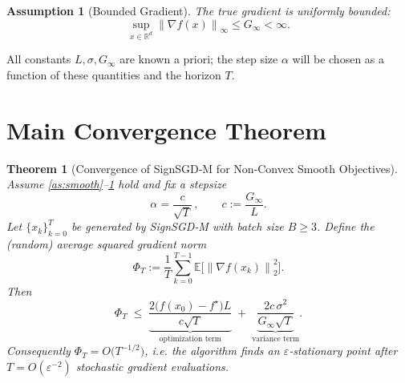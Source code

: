 \documentclass{article}
\newtheorem{theorem}{Theorem}
\newtheorem{assumption}{Assumption}
\newcommand{\EE}{\mathbb{E}}
\newcommand{\RR}{\mathbb{R}}
\newcommand{\norm}[1]{\left\lVert#1\right\rVert}
\begin{document}
\begin{assumption}[Bounded Gradient]\label{as:bound}
The true gradient is uniformly bounded:
\[
\sup_{x\in\RR^{d}}\norm{\nabla f(x)}_{\infty}\le G_{\infty}<\infty .
\tag{A4}
\]
\end{assumption}

All constants $L,\sigma,G_{\infty}$ are known a priori; the step size $\alpha$ will be chosen
as a function of these quantities and the horizon $T$.

\section*{Main Convergence Theorem}
\begin{theorem}[Convergence of SignSGD‑M for Non‑Convex Smooth Objectives]\label{thm:main}
Assume \ref{as:smooth}–\ref{as:bound} hold and fix a stepsize
\[
\alpha = \frac{c}{\sqrt{T}}\,,\qquad 
c:=\frac{G_{\infty}}{L}.
\tag{2}
\]
Let $\{x_{k}\}_{k=0}^{T}$ be generated by SignSGD‑M with batch size $B\ge 3$.
Define the (random) average squared gradient norm
\[
\Phi_{T}:=\frac{1}{T}\sum_{k=0}^{T-1}\EE\!\bigl[\norm{\nabla f(x_{k})}_{2}^{2}\bigr].
\]
Then
\[
\Phi_{T}\;\le\;
\underbrace{\frac{2\bigl(f(x_{0})-f^{\star}\bigr)L}{c\sqrt{T}}}_{\text{optimization term}}
\;+\;
\underbrace{\frac{2c\,\sigma^{2}}{G_{\infty}\sqrt{T}}}_{\text{variance term}} .
\tag{3}
\]
Consequently $\Phi_{T}=O\!\bigl(T^{-1/2}\bigr)$, i.e. the algorithm finds an
$\varepsilon$‑stationary point after $T=O(\varepsilon^{-2})$ stochastic gradient evaluations.
\end{theorem}
\end{document}
